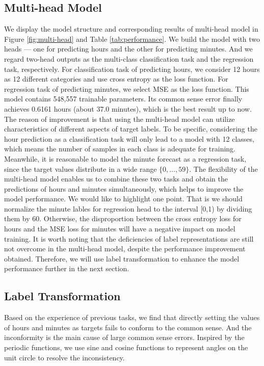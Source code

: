\documentclass{article}
\begin{document}
\subsection{Multi-head Model}
We display the model structure and corresponding results of multi-head model in Figure \ref{fig:multi-head} and Table \ref{tab:performance}. We build the model with two heads --- one for predicting hours and the other for predicting minutes. And we regard two-head outputs as the multi-class classification task and the regression task, respectively. For classification task of predicting hours, we consider 12 hours as 12 different categories and use cross entropy as the loss function. For regression task of predicting minutes, we select MSE as the loss function. This model contains 548,557 trainable parameters. Its common sense error finally achieves 0.6161 hours (about 37.0 minutes), which is the best result up to now. The reason of improvement is that using the multi-head model can utilize characteristics of different aspects of target labels. To be specific, considering the hour prediction as a classification task will only lead to a model with 12 classes, which means the number of samples in each class is adequate for training. Meanwhile, it is reasonable to model the minute forecast as a regression task, since the target values distribute in a wide range $\{0,\dots,59\}$. The flexibility of the multi-head model enables us to combine these two tasks and obtain the predictions of hours and minutes simultaneously, which helps to improve the model performance. We would like to highlight one point. That is we should normalize the minute lables for regression head to the interval [0,1) by dividing them by 60. Otherwise, the disproportion between the cross entropy loss for hours and the MSE loss for minutes will have a negative impact on model training. It is worth noting that the deficiencies of label representations are still not overcome in the multi-head model, despite the performance improvement obtained. Therefore, we will use label transformation to enhance the model performance further in the next section.

\subsection{Label Transformation}
Based on the experience of previous tasks, we find that directly setting the values of hours and minutes as targets fails to conform to the common sense. And the inconformity is the main cause of large common sense errors. Inspired by the periodic functions, we use sine and cosine functions to represent angles on the unit circle to resolve the inconsistency.
\end{document}
